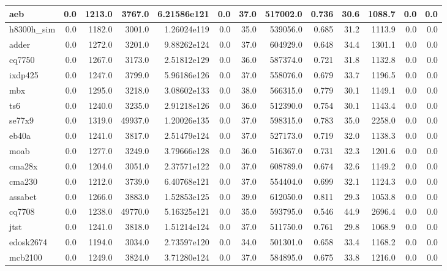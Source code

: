 \begin{tabular}{|l r r r r| r r r r r r | r r|}
\hline
aeb & 0.0 & 1213.0 & 3767.0 & 6.21586e121 & 0.0 & 37.0 & 517002.0 & 0.736 & 30.6 & 1088.7 & 0.0 & 0.0 \\
\hline
h8300h\_sim & 0.0 & 1182.0 & 3001.0 & 1.26024e119 & 0.0 & 35.0 & 539056.0 & 0.685 & 31.2 & 1113.9 & 0.0 & 0.0 \\
\hline
adder & 0.0 & 1272.0 & 3201.0 & 9.88262e124 & 0.0 & 37.0 & 604929.0 & 0.648 & 34.4 & 1301.1 & 0.0 & 0.0 \\
\hline
cq7750 & 0.0 & 1267.0 & 3173.0 & 2.51812e129 & 0.0 & 36.0 & 587374.0 & 0.721 & 31.8 & 1132.8 & 0.0 & 0.0 \\
\hline
ixdp425 & 0.0 & 1247.0 & 3799.0 & 5.96186e126 & 0.0 & 37.0 & 558076.0 & 0.679 & 33.7 & 1196.5 & 0.0 & 0.0 \\
\hline
mbx & 0.0 & 1295.0 & 3218.0 & 3.08602e133 & 0.0 & 38.0 & 566315.0 & 0.779 & 30.1 & 1149.1 & 0.0 & 0.0 \\
\hline
ts6 & 0.0 & 1240.0 & 3235.0 & 2.91218e126 & 0.0 & 36.0 & 512390.0 & 0.754 & 30.1 & 1143.4 & 0.0 & 0.0 \\
\hline
se77x9 & 0.0 & 1319.0 & 49937.0 & 1.20026e135 & 0.0 & 37.0 & 598315.0 & 0.783 & 35.0 & 2258.0 & 0.0 & 0.0 \\
\hline
eb40a & 0.0 & 1241.0 & 3817.0 & 2.51479e124 & 0.0 & 37.0 & 527173.0 & 0.719 & 32.0 & 1138.3 & 0.0 & 0.0 \\
\hline
moab & 0.0 & 1277.0 & 3249.0 & 3.79666e128 & 0.0 & 36.0 & 516367.0 & 0.731 & 32.3 & 1201.6 & 0.0 & 0.0 \\
\hline
cma28x & 0.0 & 1204.0 & 3051.0 & 2.37571e122 & 0.0 & 37.0 & 608789.0 & 0.674 & 32.6 & 1149.2 & 0.0 & 0.0 \\
\hline
cma230 & 0.0 & 1212.0 & 3739.0 & 6.40768e121 & 0.0 & 37.0 & 554404.0 & 0.699 & 32.1 & 1124.3 & 0.0 & 0.0 \\
\hline
assabet & 0.0 & 1266.0 & 3883.0 & 1.52853e125 & 0.0 & 39.0 & 612050.0 & 0.811 & 29.3 & 1053.8 & 0.0 & 0.0 \\
\hline
cq7708 & 0.0 & 1238.0 & 49770.0 & 5.16325e121 & 0.0 & 35.0 & 593795.0 & 0.546 & 44.9 & 2696.4 & 0.0 & 0.0 \\
\hline
jtst & 0.0 & 1241.0 & 3818.0 & 1.51214e124 & 0.0 & 37.0 & 511750.0 & 0.761 & 29.8 & 1068.9 & 0.0 & 0.0 \\
\hline
edosk2674 & 0.0 & 1194.0 & 3034.0 & 2.73597e120 & 0.0 & 34.0 & 501301.0 & 0.658 & 33.4 & 1168.2 & 0.0 & 0.0 \\
\hline
mcb2100 & 0.0 & 1249.0 & 3824.0 & 3.71280e124 & 0.0 & 37.0 & 584895.0 & 0.675 & 33.8 & 1216.0 & 0.0 & 0.0 \\

\end{tabular}
